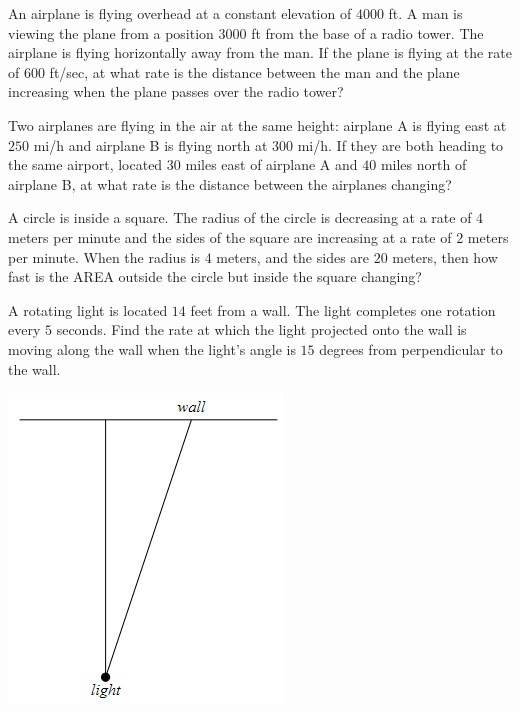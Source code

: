 \begin{exercise}

An airplane is flying overhead at a constant elevation of \(4000\) ft. A
man is viewing the plane from a position \(3000\) ft from the base of a
radio tower. The airplane is flying horizontally away from the man. If
the plane is flying at the rate of \(600\) ft/sec, at what rate is the
distance between the man and the plane increasing when the plane passes
over the radio tower?

\end{exercise}
\vspace*{6\baselineskip}

\begin{exercise}

Two airplanes are flying in the air at the same height: airplane A is
flying east at \(250\) mi/h and airplane B is flying north at \(300\)
mi/h. If they are both heading to the same airport, located \(30\) miles
east of airplane A and \(40\) miles north of airplane B, at what rate is
the distance between the airplanes changing?

\end{exercise}
\vspace*{6\baselineskip}

\begin{exercise}

A circle is inside a square. The radius of the circle is decreasing at a
rate of \(4\) meters per minute and the sides of the square are
increasing at a rate of \(2\) meters per minute. When the radius is
\(4\) meters, and the sides are \(20\) meters, then how fast is the AREA
outside the circle but inside the square changing?

\end{exercise}
\vspace*{6\baselineskip}

\begin{exercise}

A rotating light is located \(14\) feet from a wall. The light completes
one rotation every \(5\) seconds. Find the rate at which the light
projected onto the wall is moving along the wall when the light's angle
is \(15\) degrees from perpendicular to the wall.

\includegraphics[scale=0.5]{img/image-20201007133107751.png}

\end{exercise}
\vspace*{6\baselineskip}

